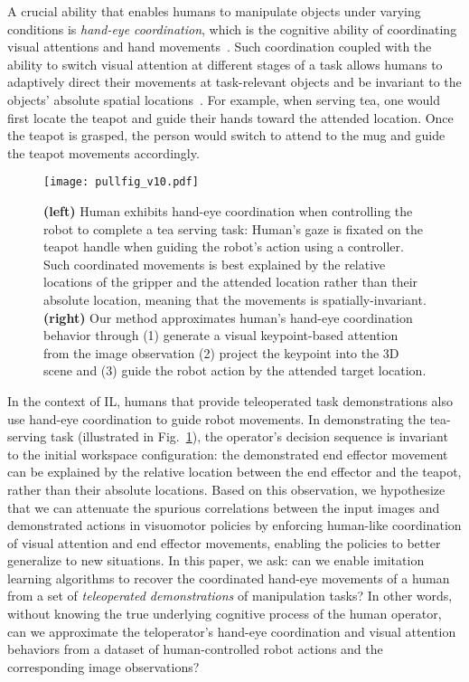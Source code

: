 \documentclass[letterpaper, 10 pt, conference]{ieeeconf}
\begin{document}
A crucial ability that enables humans to manipulate objects under varying conditions is \emph{hand-eye coordination}, which is the cognitive ability of coordinating visual attentions and hand movements~\cite{johansson2001eye}. Such coordination coupled with the ability to switch visual attention at different stages of a task allows humans to adaptively direct their movements at task-relevant objects and be invariant to the objects' absolute spatial locations~\cite{johansson2001eye,bowman2009eye,rothkopf2007task}. For example, when serving tea, one would first locate the teapot and guide their hands toward the attended location. Once the teapot is grasped, the person would switch to attend to the mug and guide the teapot movements accordingly. 

\begin{figure}[t]
	\centering
    \texttt{[image: pullfig\_v10.pdf]}
	\caption{
	\textbf{(left)} Human exhibits hand-eye coordination when controlling the robot to complete a tea serving task: Human's gaze is fixated on the teapot handle when guiding the robot's action using a controller. Such coordinated movements is best explained by the relative locations of the gripper and the attended location rather than their absolute location, meaning that the movements is spatially-invariant.
	\textbf{(right)} Our method approximates  human's hand-eye coordination behavior through (1) generate a visual keypoint-based attention from the image observation (2) project the keypoint into the 3D scene and (3) guide the robot action by the attended target location.
	}
	\label{fig:pullfig}
\end{figure}


In the context of IL, humans that provide teleoperated task demonstrations also use hand-eye coordination to guide robot movements. In demonstrating the tea-serving task (illustrated in Fig.~\ref{fig:pullfig}), the operator's decision sequence is invariant to the initial workspace configuration: the demonstrated end effector movement can be explained by the relative location between the end effector and the teapot, rather than their absolute locations. Based on this observation, we hypothesize that we can attenuate the spurious correlations between the input images and demonstrated actions in visuomotor policies by enforcing human-like coordination of visual attention and end effector movements, enabling the policies to better generalize to new situations.
In this paper, we ask: can we enable imitation learning algorithms to recover the coordinated hand-eye movements of a human from a set of \emph{teleoperated demonstrations} of manipulation tasks? In other words, without knowing the true underlying cognitive process of the human operator, can we approximate the teloperator's hand-eye coordination and visual attention behaviors from a dataset of human-controlled robot actions and the corresponding image observations? 
\end{document}

